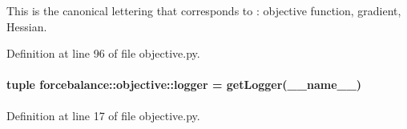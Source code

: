 \-This is the canonical lettering that corresponds to \-: objective function, gradient, \-Hessian. 



\-Definition at line 96 of file objective.\-py.

\hypertarget{namespaceforcebalance_1_1objective_afa1d976cc1f8b18cf0b03f1ccf49f590}{
\paragraph[{logger}]{\setlength{\rightskip}{0pt plus 5cm}tuple {\bf forcebalance\-::objective\-::logger} = get\-Logger(\-\_\-\-\_\-name\-\_\-\-\_\-)}}\label{namespaceforcebalance_1_1objective_afa1d976cc1f8b18cf0b03f1ccf49f590}


\-Definition at line 17 of file objective.\-py.

